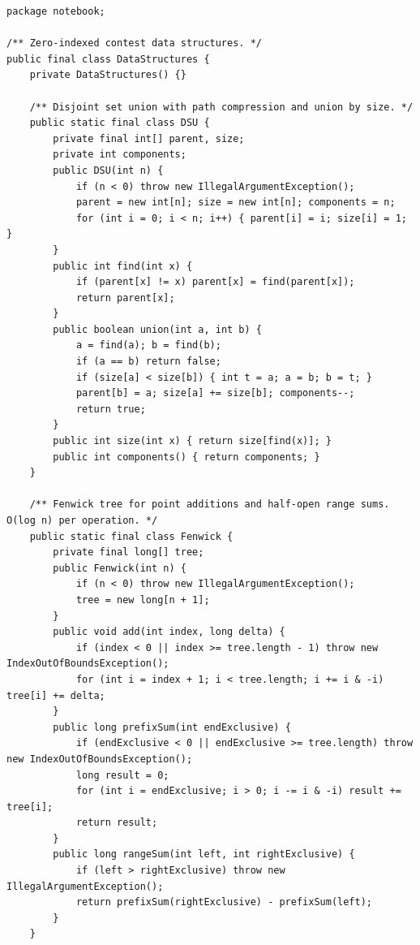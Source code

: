 \documentclass[10pt,letterpaper]{article}
\begin{document}
\begin{lstlisting}
package notebook;

/** Zero-indexed contest data structures. */
public final class DataStructures {
    private DataStructures() {}

    /** Disjoint set union with path compression and union by size. */
    public static final class DSU {
        private final int[] parent, size;
        private int components;
        public DSU(int n) {
            if (n < 0) throw new IllegalArgumentException();
            parent = new int[n]; size = new int[n]; components = n;
            for (int i = 0; i < n; i++) { parent[i] = i; size[i] = 1; }
        }
        public int find(int x) {
            if (parent[x] != x) parent[x] = find(parent[x]);
            return parent[x];
        }
        public boolean union(int a, int b) {
            a = find(a); b = find(b);
            if (a == b) return false;
            if (size[a] < size[b]) { int t = a; a = b; b = t; }
            parent[b] = a; size[a] += size[b]; components--;
            return true;
        }
        public int size(int x) { return size[find(x)]; }
        public int components() { return components; }
    }

    /** Fenwick tree for point additions and half-open range sums. O(log n) per operation. */
    public static final class Fenwick {
        private final long[] tree;
        public Fenwick(int n) {
            if (n < 0) throw new IllegalArgumentException();
            tree = new long[n + 1];
        }
        public void add(int index, long delta) {
            if (index < 0 || index >= tree.length - 1) throw new IndexOutOfBoundsException();
            for (int i = index + 1; i < tree.length; i += i & -i) tree[i] += delta;
        }
        public long prefixSum(int endExclusive) {
            if (endExclusive < 0 || endExclusive >= tree.length) throw new IndexOutOfBoundsException();
            long result = 0;
            for (int i = endExclusive; i > 0; i -= i & -i) result += tree[i];
            return result;
        }
        public long rangeSum(int left, int rightExclusive) {
            if (left > rightExclusive) throw new IllegalArgumentException();
            return prefixSum(rightExclusive) - prefixSum(left);
        }
    }


\end{lstlisting}
\end{document}

